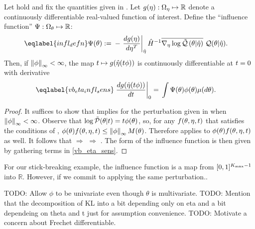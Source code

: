 \begin{cor}
%
Let  hold and fix the quantities given in
. Let $g(\eta): \Omega_{\eta} \mapsto \mathbb{R}$ denote a
continuously differentiable real-valued function of interest.  Define the
``influence function'' $\Psi: \Omega_{\theta} \mapsto \mathbb{R}$:
%
\begin{align}\eqlabel{infl_defn}
%
\infl(\theta) :={}&
    - \fracat{d g(\eta)}{ d \eta^T}{\etaopt} \hessopt^{-1}
        \lqgradbar{\theta \vert \etaopt}
        \q(\theta \vert \etaopt).
%
\end{align}
%
Then, if $\left\Vert\phi\right\Vert_{\infty} < \infty$, the map $t \mapsto g(\hat\eta(t \phi))$ is
continuously differentiable at $t=0$ with derivative
%
\begin{align}\eqlabel{vb_eta_infl_sens}
%
\fracat{d g(\etaopt(\t \phi))}{d \t}{0} ={}&
    \int \infl(\theta) \phi(\theta) \mu(d\theta).
%
\end{align}
%
\begin{proof}
%
It suffices to show that  implies
 for the perturbation given in 
when $\left\Vert\phi\right\Vert_{\infty} < \infty$.  Observe that $\log \tilde{\mathcal{P}}(\theta \vert t) = t
\phi(\theta)$, so, for any $f(\theta, \eta, t)$ that satisfies the conditions
of ,
%
%
$\phi(\theta) f(\theta, \eta, t) \le \left\Vert\phi\right\Vert_{\infty} M(\theta)$.
%
%
Therefore  applies to $\phi(\theta) f(\theta, \eta, t)$
as well.  It follows that  $\Rightarrow$
 $\Rightarrow$ .
%
The form of the influence function is then given by gathering terms in
\eqref{vb_eta_sens}.
%
\end{proof}
%
\end{cor}



\begin{ex}
%
For our stick-breaking example, the influence function is a map
from $[0,1]^{{K_{\mathrm{max}}} - 1}$ into $\mathbb{R}$.  However, if we commit to
applying the same perturbation..

TODO: Allow $\phi$ to be univariate even though $\theta$ is multivariate.
TODO: Mention that the decomposition of KL into a bit depending only
on eta and a bit dependeing on theta and t just for assumption convenience.
TODO: Motivate a concern about Frechet differentiable.
%
\end{ex}
